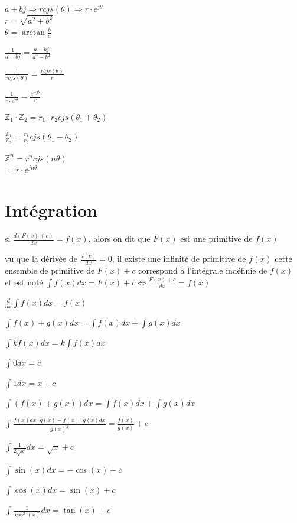 \documentclass[a4paper,12pt]{article}
\newcommand\tab[1][]{\hspace*{#1}}
\newcommand\Warning{%
 \makebox[1.4em][c]{%
 \makebox[0pt][c]{\raisebox{.1em}{\small!}}%
 \makebox[0pt][c]{\color{red}\Large$\bigtriangleup$}}}%
\begin{document}
$a + bj \Rightarrow r cjs(\theta ) \Rightarrow r \cdot e^{j\theta}$ \\
\tab[1cm]$r=\sqrt{a^2 + b^2}$ \\
\tab[1cm]$\theta = \arctan \frac{b}{a}$

$\frac{1}{a + bj} = \frac{a - bj}{a^2 - b^2}$

$\frac{1}{rcjs(\theta)} = \frac{rcjs(\theta)}{r}$

$\frac{1}{r \cdot e^{j\theta}} = \frac{e^{-j\theta}}{r}$

$\mathbb{Z}_1 \cdot \mathbb{Z}_2 = r_1 \cdot r_2 cjs(\theta_1 + \theta_2)$

$\frac{\mathbb{Z}_1}{\mathbb{Z}_2}  = \frac{r_1}{r_2} cjs(\theta_1 - \theta_2)$

$\mathbb{Z}^n = r^ncjs(n\theta)$\\
\tab[.6cm]$= r \cdot e^{jn\theta}$

\newpage
\section{Intégration}

si $\frac{d(F(x)+c)}{dx} = f(x)$, alors on dit que $F(x)$ est une primitive de $f(x)$

\Warning vu que la dérivée de $\frac{d(c)}{dx}=0$, il existe une infinité de primitive de $f(x)$ cette ensemble de primitive de $F(x)+c$ correspond à l'intégrale indéfinie de $f(x)$ et est noté $\int{f(x)dx=F(x)+c} \Leftrightarrow \frac{F(x)+c}{dx}=f(x)$  

\vspace{\baselineskip}
$\frac{d}{dx}\int{f(x)dx}=f(x)$

$\int{f(x)\pm g(x)dx}=\int{f(x)dx}\pm \int{g(x)dx}$

$\int{k f(x)dx}= k\int{f(x)dx}$

\vspace{\baselineskip}
$\int{0 dx} = c$

$\int{1 dx} = x +c$

$\int{(f(x)+g(x)) dx} = \int{f(x)dx} + \int{g(x)dx}$

$\int{\frac{f(x)dx \cdot g(x) - f(x) \cdot g(x)dx}{g(x)^2} } = \frac{f(x)}{g(x)} + c$

$\int{\frac{1}{2\sqrt{x}}dx} = \sqrt{x} +c$

$\int{\sin(x)dx} = -\cos(x)+c$

$\int{\cos(x) dx} = \sin(x)+c$

$\int{\frac{1}{\cos^2(x)} dx} = \tan(x) +c$
\end{document}
